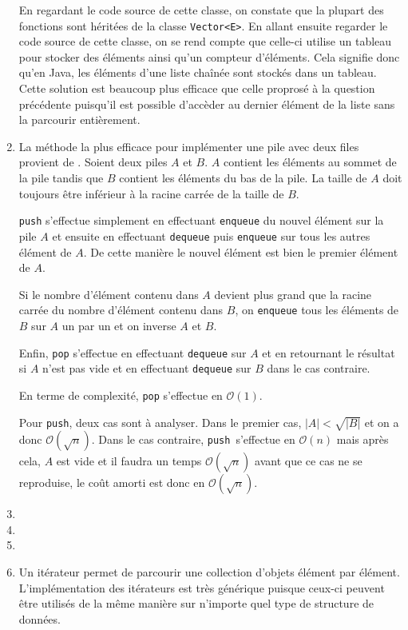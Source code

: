 \begin{enumerate}
	En regardant le code source de cette classe, on
	constate que la plupart des fonctions sont héritées
	de la classe \lstinline{Vector<E>}. En
	allant ensuite regarder le code source de cette classe,
	on se rend compte que celle-ci utilise un tableau pour
	stocker des éléments ainsi qu'un compteur d'éléments. 
	Cela signifie donc qu'en Java, les éléments d'une liste
	chaînée sont stockés dans un tableau. Cette solution
	est beaucoup plus efficace que celle proprosé à la
	question précédente puisqu'il est possible d'accèder au
	dernier élément de la liste sans la parcourir entièrement.
	\item La méthode la plus efficace pour implémenter
	une pile avec deux files provient de \cite{stack1}.
	Soient deux piles $A$ et $B$. $A$ contient les
	éléments au sommet de la pile tandis que $B$
	contient les éléments du bas de la pile. La taille
	de $A$ doit toujours être inférieur à la
	racine carrée de la taille de $B$.
	
	\lstinline{push} s'effectue simplement
	en effectuant \lstinline{enqueue} 
	du nouvel élément sur la pile $A$ et ensuite en
	effectuant \lstinline{dequeue} puis
	\lstinline{enqueue} sur tous les autres
	élément de $A$. De cette manière le nouvel élément
	est bien le premier élément de $A$.
	
	Si le nombre d'élément contenu dans $A$ devient
	plus grand que la racine carrée du nombre
	d'élément contenu dans $B$, on
	\lstinline{enqueue} tous les éléments
	de $B$ sur $A$ un par un et on inverse $A$ et $B$.
	
	Enfin, \lstinline{pop} s'effectue en
	effectuant \lstinline{dequeue} sur $A$
	et en retournant le résultat si $A$ n'est pas vide
	et en effectuant \lstinline{dequeue}
	sur $B$ dans le cas contraire.
	
	En terme de complexité,
	\lstinline{pop} s'effectue en
	$\mathcal{O}(1)$.
	
	Pour \lstinline{push}, deux cas sont
	à analyser. Dans le premier cas,
	$|A| < \sqrt{|B|}$ et on a donc
	$\mathcal{O}(\sqrt{n})$. Dans le cas contraire,
	\lstinline{push}\ s'effectue en
	$\mathcal{O}(n)$ mais après cela, $A$ est vide et
	il faudra un temps $\mathcal{O}(\sqrt{n})$ avant
	que ce cas ne se reproduise, le coût amorti est
	donc en $\mathcal{O}(\sqrt{n})$.
	\item
	\item
	\item
	\item Un itérateur permet de parcourir une collection
        d'objets élément par élément. L'implémentation des
        itérateurs est très générique puisque ceux-ci peuvent
        être utilisés de la même manière sur n'importe quel
        type de structure de données.
	

\end{enumerate}
